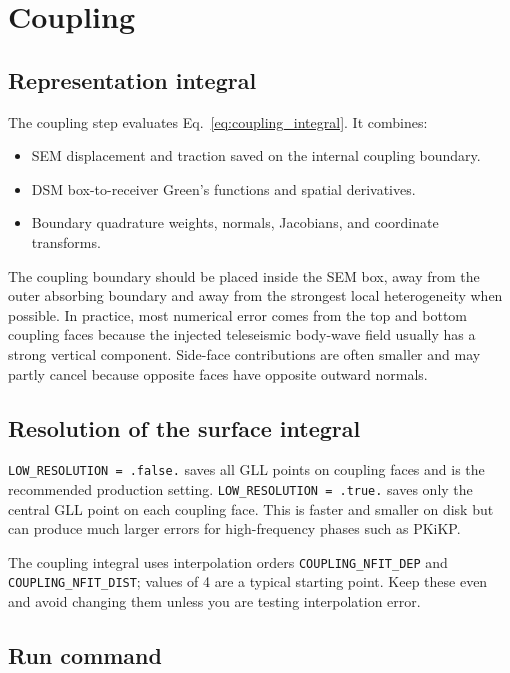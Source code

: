 \documentclass[11pt,oneside]{book}
\DeclareRobustCommand{\code}[1]{\nolinkurl{#1}}
\begin{document}
\chapter{Coupling}

\section{Representation integral}

The coupling step evaluates Eq.~\ref{eq:coupling_integral}. It combines:
\begin{itemize}
  \item SEM displacement and traction saved on the internal coupling boundary.
  \item DSM box-to-receiver Green's functions and spatial derivatives.
  \item Boundary quadrature weights, normals, Jacobians, and coordinate
  transforms.
\end{itemize}

The coupling boundary should be placed inside the SEM box, away from the outer
absorbing boundary and away from the strongest local heterogeneity when
possible. In practice, most numerical error comes from the top and bottom
coupling faces because the injected teleseismic body-wave field usually has a
strong vertical component. Side-face contributions are often smaller and may
partly cancel because opposite faces have opposite outward normals.

\section{Resolution of the surface integral}

\code{LOW_RESOLUTION = .false.} saves all GLL points on coupling faces and is
the recommended production setting. \code{LOW_RESOLUTION = .true.} saves only
the central GLL point on each coupling face. This is faster and smaller on
disk but can produce much larger errors for high-frequency phases such as
PKiKP.

The coupling integral uses interpolation orders
\code{COUPLING_NFIT_DEP} and \code{COUPLING_NFIT_DIST}; values of 4 are a
typical starting point. Keep these even and avoid changing them unless you are
testing interpolation error.

\section{Run command}
\end{document}

